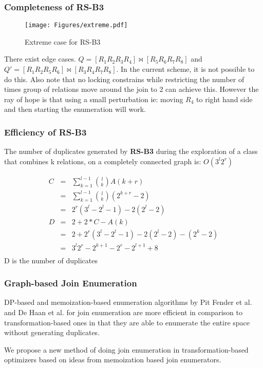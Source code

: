 \documentclass{beamer}
\begin{document}
  \begin{frame}
  \frametitle{Completeness of RS-B3}
\begin{figure}[here]
\begin{center}
\texttt{[image: Figures/extreme.pdf]}
\end{center}
\caption{Extreme case for RS-B3}
\label{fig:extreme}
\end{figure}
There exist edge cases. $Q = [R_{1}R_{2}R_{3}R_{4}]\bowtie[R_{5}R_{6}R_{7}R_{8}]$ and $Q' = [R_{1}R_{2}R_{5}R_{6}]\bowtie[R_{3}R_{4}R_{7}R_{8}]$. In the current scheme, it is not possible to do this. Also note that no locking constrains while restricting the number of times group of relations move around the join to 2 can achieve this. However the ray of hope is that using a small perturbation ie: moving $R_{4}$ to right hand side and then starting the enumeration will work.
  \end{frame}
  
  \begin{frame}
  \frametitle{Efficiency of RS-B3}
  The number of duplicates generated by \textbf{RS-B3} during the exploration of a class that combines k relations, on a completely connected graph is: $O(3^l2^r)$
  
  \begin{eqnarray*}
C &=& \sum\limits_{k=1}^{l-1} {l \choose k} A(k+r) \nonumber \\ 
 &=& \sum\limits_{k=1}^{l-1} {l \choose k} (2^{k+r} - 2) \nonumber \\
 &=& 2^r (3^l - 2^l - 1) - 2 (2^l - 2) \nonumber \\
 	D &=& 2 + 2*C - A(k) \nonumber \\
	  &=& 2 + 2^r (3^l - 2^l - 1) - 2 (2^l - 2) - (2^k - 2) \nonumber \\
	  &=& 3^l 2^r - 2^{k+1} - 2^r - 2^{l+1} +  8 \nonumber \\
\end{eqnarray*}
 D is the number of duplicates
  \end{frame}
  
\begin{frame}
\frametitle{Graph-based Join Enumeration}
DP-based and memoization-based enumeration algorithms by Pit Fender et al. and De Haan et al. for join enumeration are more efficient in comparison to transformation-based ones in that they are able to enumerate the entire space without generating duplicates. \vspace{\baselineskip}

We propose a new method of doing join enumeration in transformation-based optimizers based on ideas from memoization based join enumerators.
\end{frame}  
  
\end{document}
